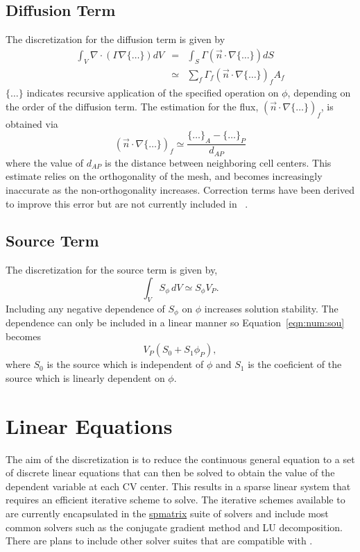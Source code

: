 \subsection{Diffusion Term}

The discretization for the diffusion term is given by
\begin{eqnarray}
\int_V \nabla \cdot (\Gamma\nabla\{\ldots\}) dV 
& = & \int_S \Gamma (\vec{n} \cdot \nabla\{\ldots\}) dS \\
& \simeq & \sum_f \Gamma_f (\vec{n} \cdot \nabla\{\ldots\})_f A_f
\label{eqn:num:dif}
\end{eqnarray}
$\{\ldots\}$ indicates recursive application of the specified 
operation on \( \phi \), depending on 
the order of the diffusion term.
The estimation for the flux, $(\vec{n} \cdot \nabla\{\ldots\})_f$, is
obtained via
\begin{equation}
(\vec{n} \cdot \nabla\{\ldots\})_f \simeq \frac{\{\ldots\}_A-\{\ldots\}_P}{d_{AP}}
\end{equation}
where the value of $d_{AP}$ is the distance between neighboring cell
centers.  This estimate relies on the orthogonality of the mesh, and
becomes increasingly inaccurate as the non-orthogonality increases.
Correction terms have been derived to improve this error but are not
currently included in \FiPy{}~\cite{croftphd}.

\subsection{Source Term}

The discretization for the source term is given by, 
\begin{equation}
\int_V S_{\phi}\,dV \simeq S_\phi V_P.
\label{eqn:num:sou}
\end{equation}
Including any negative dependence of $S_\phi$ on $\phi$ increases
solution stability. The dependence can only be included in a linear
manner so Equation~\eqref{eqn:num:sou} becomes
\begin{equation}
V_P (S_0 + S_1 \phi_P),
\end{equation}
where \( S_0 \) is the source which is independent of \( \phi \) and
\( S_1 \) is the coeficient of the source which is linearly dependent
on \( \phi \).

\section{Linear Equations}

The aim of the discretization is to reduce the continuous general
equation to a set of discrete linear equations that can then be solved
to obtain the value of the dependent variable at each CV center. This
results in a sparse linear system that requires an efficient iterative
scheme to solve. The iterative schemes available to \FiPy{} are
currently encapsulated in the \href{#id5}{spmatrix} suite of solvers
and include most common solvers such as the conjugate gradient method
and LU decomposition. There are plans to include other solver suites
that are compatible with \Python{}.

